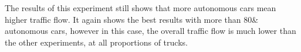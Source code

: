 The results of this experiment still shows that more autonomous cars mean higher traffic flow. It again shows the best results with more than 80\& autonomous cars, however in this case, the overall traffic flow is much lower than the other experiments, at all proportions of trucks.

